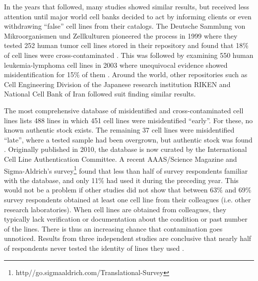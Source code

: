 \documentclass[12pt]{article}
\begin{document}
In the years that followed, many studies showed similar results, but received less attention until major world cell banks decided to act by informing clients or even withdrawing ``false'' cell lines from their catalogs. The Deutsche Sammlung von Mikroorganismen und Zellkulturen pioneered the process in 1999 where they tested 252 human tumor cell lines stored in their repository and found that 18\% of cell lines were cross-contaminated \cite{macleod1999widespread}. This was followed by examining 550 human leukemia-lymphoma cell lines in 2003 where unequivocal evidence showed misidentification for 15\% of them \cite{drexler2003false}. Around the world, other repositories such as Cell Engineering Division of the Japanese research institution RIKEN \cite{yoshino2006essential} and National Cell Bank of Iran \cite{azari2007profiling} followed suit finding similar results.



The most comprehensive database of misidentified and cross-contaminated cell lines lists 488 lines in which 451 cell lines were misidentified ``early''. For these, no known authentic stock exists. The remaining 37 cell lines were misidentified ``late'', where a tested sample had been overgrown, but authentic stock was found \cite{capes2010check}. Originally published in 2010, the database is now curated by the International Cell Line Authentication Committee. A recent AAAS/Science Magazine and Sigma-Aldrich's survey\footnote{http//go.sigmaaldrich.com/Translational-Survey} found that less than half of survey respondents  familiar with the database, and only 11\% had used it during the preceding year. This would not be a problem if other studies did not show that between 63\% \cite{buehring2004cell} and 69\% \cite{shannon2016cell} survey respondents obtained at least one cell line from their colleagues (i.e. other research laboratories). When cell lines are obtained from colleagues, they typically lack verification or documentation about the condition or past number of the lines. There is thus an increasing chance that contamination goes unnoticed. Results from three independent studies are conclusive that nearly half of respondents never tested the identity of lines they used \cite{buehring2004cell, shannon2016cell, freedman2014culture}.
\end{document}
